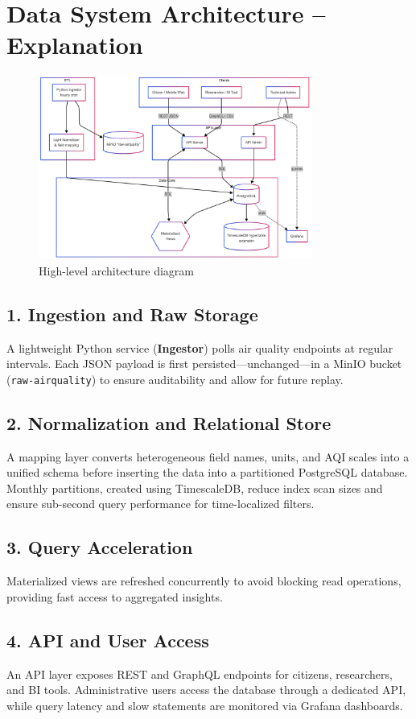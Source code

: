\section{Data System Architecture – Explanation}

\begin{figure}[H]
  \centering
  \includegraphics[width=0.8\textwidth]{Imagenes/Arquitectura.png}
  \caption{High-level architecture diagram}
\end{figure}

\subsection*{1. Ingestion and Raw Storage}
A lightweight Python service (\textbf{Ingestor}) polls air quality endpoints at regular intervals. Each JSON payload is first persisted—unchanged—in a MinIO bucket (\texttt{raw-airquality}) to ensure auditability and allow for future replay.

\subsection*{2. Normalization and Relational Store}
A mapping layer converts heterogeneous field names, units, and AQI scales into a unified schema before inserting the data into a partitioned PostgreSQL database. Monthly partitions, created using TimescaleDB, reduce index scan sizes and ensure sub-second query performance for time-localized filters.

\subsection*{3. Query Acceleration}
Materialized views are refreshed concurrently to avoid blocking read operations, providing fast access to aggregated insights.

\subsection*{4. API and User Access}
An API layer exposes REST and GraphQL endpoints for citizens, researchers, and BI tools. Administrative users access the database through a dedicated API, while query latency and slow statements are monitored via Grafana dashboards.
\newpage